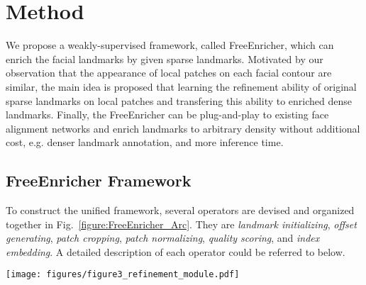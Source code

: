 \documentclass[letterpaper]{article} \usepackage{aaai23}  \usepackage{times}  \usepackage{helvet}  \usepackage{courier}  \usepackage[hyphens]{url}  \usepackage{graphicx} \urlstyle{rm} \def\UrlFont{\rm}  \usepackage{natbib}  \usepackage{caption} \frenchspacing  \setlength{\pdfpagewidth}{8.5in}  \setlength{\pdfpageheight}{11in}  \usepackage{algorithm}
\begin{document}
\section{Method}
\label{sec:method}
We propose a weakly-supervised framework, called FreeEnricher, which can enrich the facial landmarks by given sparse landmarks.
Motivated by our observation that the appearance of local patches on each facial contour are similar,
the main idea is proposed that learning the refinement ability of original sparse landmarks on local patches and transfering this ability to enriched dense landmarks.
Finally, the FreeEnricher can be plug-and-play to existing face alignment networks and enrich landmarks to arbitrary density without additional cost, e.g. denser landmark annotation, and more inference time.

\subsection{FreeEnricher Framework}
To construct the unified framework, several operators are devised and organized together in Fig.~\ref{figure:FreeEnricher_Arc}.
They are \emph{landmark initializing}, \emph{offset generating}, \emph{patch cropping}, \emph{patch normalizing}, \emph{quality scoring}, and \emph{index embedding}.
A detailed description of each operator could be referred to below.

\begin{figure*}[h]
\vspace{-10px}
\begin{center}
\texttt{[image: figures/figure3\_refinement\_module.pdf]}
\end{center}
   \caption{
   The framework of FreeEnricher.
   The framework employs the proposed weakly-supervised idea to enrich landmarks that training on the original sparse landmarks and testing on the enriched dense landmarks.
   In training stage, as shown in the upper part of the figure, a random offset is supervised on each normalized patch per sparse landmark and applies the normalized quality score as weight in loss function.
   In testing stage, as shown in the lower part of the figure, the enriched landmarks are initialized firstly, then refined by the trained model for each of them.
   Briefly explaining symbols,  is the face image,  is the original landmarks,  is the initialized enriched landmarks,  is the final enriched landmarks,  is the randomly generated offset,  is the regressed offset,  is the soft index, and  is the normalized quality score.
}
\label{figure:FreeEnricher_Arc}
\vspace{-10px}
\end{figure*}
\end{document}
